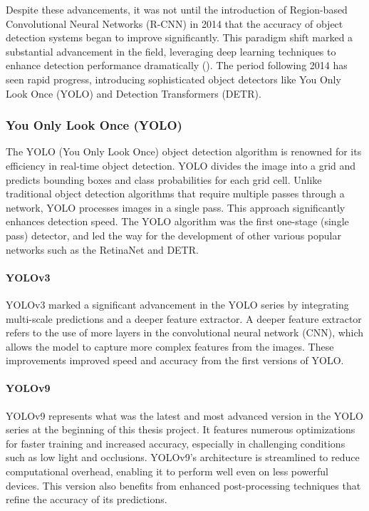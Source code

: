 Despite these advancements, it was not until the introduction of Region-based Convolutional Neural Networks (R-CNN) in 2014 that the accuracy of object detection systems began to improve significantly. This paradigm shift marked a substantial advancement in the field, leveraging deep learning techniques to enhance detection performance dramatically (\cite{zou2023object_detection_in_20_years}). The period following 2014 has seen rapid progress, introducing sophisticated object detectors like You Only Look Once (YOLO) and Detection Transformers (DETR). 

\subsubsection{You Only Look Once (YOLO)}
\label{sec:yolo}
The YOLO (You Only Look Once) object detection algorithm is renowned for its efficiency in real-time object detection. YOLO divides the image into a grid and predicts bounding boxes and class probabilities for each grid cell. Unlike traditional object detection algorithms that require multiple passes through a network, YOLO processes images in a single pass. This approach significantly enhances detection speed. The YOLO algorithm was the first one-stage (single pass) detector, and led the way for the development of other various popular networks such as the RetinaNet and DETR.

\paragraph{YOLOv3}
YOLOv3 marked a significant advancement in the YOLO series by integrating multi-scale predictions and a deeper feature extractor. A deeper feature extractor refers to the use of more layers in the convolutional neural network (CNN), which allows the model to capture more complex features from the images. These improvements improved speed and accuracy from the first versions of YOLO.  

\paragraph{YOLOv9}
YOLOv9 represents what was the latest and most advanced version in the YOLO series at the beginning of this thesis project. It features numerous optimizations for faster training and increased accuracy, especially in challenging conditions such as low light and occlusions. YOLOv9's architecture is streamlined to reduce computational overhead, enabling it to perform well even on less powerful devices. This version also benefits from enhanced post-processing techniques that refine the accuracy of its predictions.

